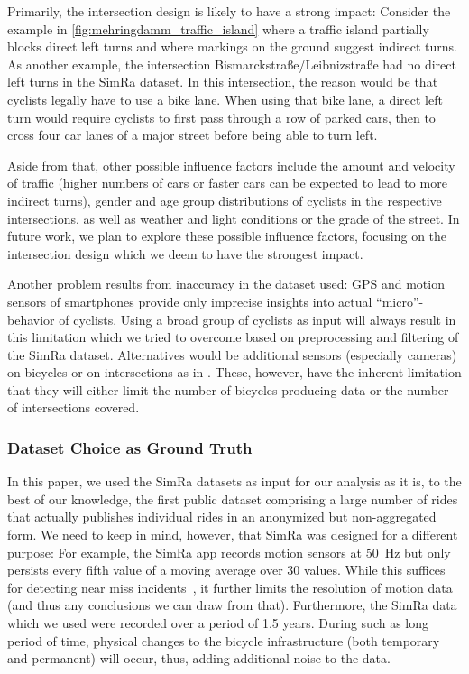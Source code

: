 Primarily, the intersection design is likely to have a strong impact:
Consider the example in \cref{fig:mehringdamm_traffic_island} where a traffic island partially blocks direct left turns and where markings on the ground suggest indirect turns.
As another example, the intersection Bismarckstraße/Leibnizstraße had no direct left turns in the SimRa dataset.
In this intersection, the reason would be that cyclists legally have to use a bike lane.
When using that bike lane, a direct left turn would require cyclists to first pass through a row of parked cars, then to cross four car lanes of a major street before being able to turn left.

Aside from that, other possible influence factors include the amount and velocity of traffic (higher numbers of cars or faster cars can be expected to lead to more indirect turns), gender and age group distributions of cyclists in the respective intersections, as well as weather and light conditions or the grade of the street.
In future work, we plan to explore these possible influence factors, focusing on the intersection design which we deem to have the strongest impact.

Another problem results from inaccuracy in the dataset used:
GPS and motion sensors of smartphones provide only imprecise insights into actual ``micro''-behavior of cyclists.
Using a broad group of cyclists as input will always result in this limitation which we tried to overcome based on preprocessing and filtering of the SimRa dataset.
Alternatives would be additional sensors (especially cameras) on bicycles or on intersections as in \cite{kaths2016integration}.
These, however, have the inherent limitation that they will either limit the number of bicycles producing data or the number of intersections covered.

\subsubsection{Dataset Choice as Ground Truth}
\label{subsubsec:dataset_choice_as_ground_truth}
In this paper, we used the SimRa datasets as input for our analysis as it is, to the best of our knowledge, the first public dataset comprising a large number of rides that actually publishes individual rides in an anonymized but non-aggregated form.
We need to keep in mind, however, that SimRa was designed for a different purpose:
For example, the SimRa app records motion sensors at \SI{50}{\hertz} but only persists every fifth value of a moving average over 30 values.
While this suffices for detecting near miss incidents~\cite{karakaya2020simra}, it further limits the resolution of motion data (and thus any conclusions we can draw from that).
Furthermore, the SimRa data which we used were recorded over a period of 1.5 years.
During such as long period of time, physical changes to the bicycle infrastructure (both temporary and permanent) will occur, thus, adding additional noise to the data.


